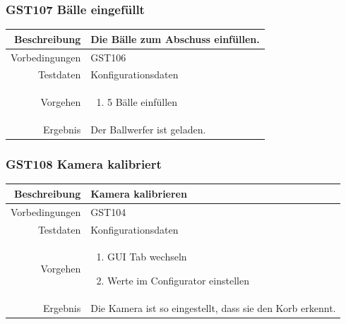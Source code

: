 \subsubsection{GST107 Bälle eingefüllt}
\begin{table}[h!]
	\renewcommand{\arraystretch}{1.5}
	\begin{tabular}{|r|p{14cm}|}
		\hline Beschreibung & Die Bälle zum Abschuss einfüllen. \\ 
		\hline Vorbedingungen &  GST106\\ 
		\hline Testdaten & Konfigurationsdaten \\ 
		\hline Vorgehen & 
		\begin{enumerate}
			\item 5 Bälle einfüllen
		\end{enumerate} \\ 
		\hline Ergebnis & Der Ballwerfer ist geladen. \\ 
		\hline 
	\end{tabular}
\end{table}

\subsubsection{GST108 Kamera kalibriert}
\begin{table}[h!]
	\renewcommand{\arraystretch}{1.5}
	\begin{tabular}{|r|p{14cm}|}
		\hline Beschreibung & Kamera kalibrieren \\ 
		\hline Vorbedingungen &  GST104\\ 
		\hline Testdaten & Konfigurationsdaten \\ 
		\hline Vorgehen & 
		\begin{enumerate}
			\item GUI Tab wechseln
			\item Werte im Configurator einstellen
		\end{enumerate} \\ 
		\hline Ergebnis & Die Kamera ist so eingestellt, dass sie den Korb erkennt. \\ 
		\hline 
	\end{tabular}
\end{table}

\newpage


\clearpage



\newpage

